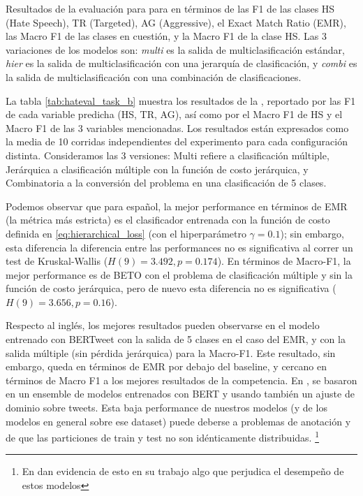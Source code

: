\begin{table}
    \caption{Resultados de la evaluación para para \subtaskb{} en términos de las F1 de las clases HS (Hate Speech), TR (Targeted), AG (Aggressive), el Exact Match Ratio (EMR), las Macro F1 de las clases en cuestión, y la Macro F1 de la clase HS. Las 3 variaciones de los modelos son: \emph{multi} es la salida de multiclasificación estándar, \emph{hier} es la salida de multiclasificación con una jerarquía de clasificación, y \emph{combi} es la salida de multiclasificación con una combinación de clasificaciones.}
    \label{tab:hateval_task_b}
\end{table}


La tabla \ref{tab:hateval_task_b} muestra los resultados de la \subtaskb{}, reportado por las F1 de cada variable predicha (HS, TR, AG), así como por el Macro F1 de HS y el Macro F1 de las 3 variables mencionadas. Los resultados están expresados como la media de 10 corridas independientes del experimento para cada configuración distinta. Consideramos las 3 versiones: Multi refiere a clasificación múltiple, Jerárquica a clasificación múltiple con la función de costo jerárquica, y Combinatoria a la conversión del problema en una clasificación de 5 clases.

Podemos observar que para español, la mejor performance en términos de EMR (la métrica más estricta) es el clasificador entrenada con la función de costo definida en \ref{eq:hierarchical_loss} (con el hiperparámetro $\gamma = 0.1$); sin embargo, esta diferencia la diferencia entre las performances no es significativa al correr un test de Kruskal-Wallis ($H(9) = 3.492, p = 0.174$). En términos de Macro-F1, la mejor performance es de BETO con el problema de clasificación múltiple y sin la función de costo jerárquica, pero de nuevo esta diferencia no es significativa ($H(9) = 3.656, p=0.16$).

Respecto al inglés, los mejores resultados pueden observarse en el modelo entrenado con BERTweet con la salida de 5 clases en el caso del EMR, y con la salida múltiple (sin pérdida jerárquica) para la Macro-F1. Este resultado, sin embargo, queda en términos de EMR por debajo del baseline, y cercano en términos de Macro F1 a los mejores resultados de la competencia. En \citet{gertner-etal-2019-mitre}, se basaron en un ensemble de modelos entrenados con BERT y usando también un ajuste de dominio sobre tweets. Esta baja performance de nuestros modelos (y de los modelos en general sobre ese dataset) puede deberse a problemas de anotación y de que las particiones de train y test no son idénticamente distribuidas. \footnote{En\citet{gertner-etal-2019-mitre} dan evidencia de esto en su trabajo algo que perjudica el desempeño de estos modelos}



